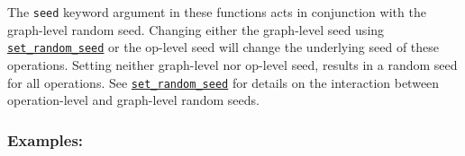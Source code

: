 The \texttt{seed} keyword argument in these functions acts in
conjunction with the graph-level random seed. Changing either the
graph-level seed using
\href{../../api_docs/python/constant_op.md\#set_random_seed}{\texttt{set\_random\_seed}}
or the op-level seed will change the underlying seed of these
operations. Setting neither graph-level nor op-level seed, results in a
random seed for all operations. See
\href{../../api_docs/python/constant_op.md\#set_random_seed}{\texttt{set\_random\_seed}}
for details on the interaction between operation-level and graph-level
random seeds.

\subsubsection{Examples: }\label{examples}

\begin{Shaded}
\begin{Highlighting}[]
\OperatorTok{=} \NormalTok{tf.random_normal([}\NormalTok{, }\NormalTok{], mean}\OperatorTok{=-}\OperatorTok{=}\NormalTok{)}

\OperatorTok{=} \NormalTok{tf.constant([[}\NormalTok{, }\NormalTok{], [}\NormalTok{, }\NormalTok{], [}\NormalTok{, }\NormalTok{]])}
\OperatorTok{=} 

\OperatorTok{=} 
 
 

\OperatorTok{=} \NormalTok{tf.constant([[}\NormalTok{, }\NormalTok{], [}\NormalTok{, }\NormalTok{], [}\NormalTok{, }\NormalTok{]])}
\OperatorTok{=} 
\OperatorTok{=} \OperatorTok{=}\NormalTok{)}
 
 
\end{Highlighting}
\end{Shaded}

